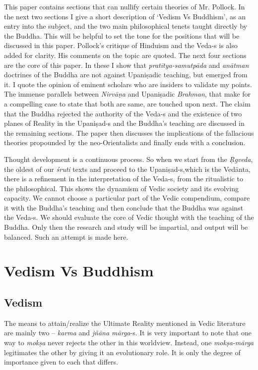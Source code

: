 This paper contains sections that can nullify certain theories of Mr. Pollock. In the next two sections I give a short description of ‘Vedism Vs Buddhism’, as an entry into the subject, and the two main philosophical tenets taught directly by the Buddha. This will be helpful to set the tone for the positions that will be discussed in this paper. Pollock’s critique of Hinduism and the Veda-s is also added for clarity. His comments on the topic are quoted. The next four sections are the core of this paper. In these I show that \textit{pratītya-samutpāda} and \textit{anātman} doctrines of the Buddha are not against Upaniṣadic teaching, but emerged from it. I quote the opinion of eminent scholars who are insiders to validate my points. The immense parallels between \textit{Nirvāṇa} and Upaniṣadic \textit{Brahman}, that make for a compelling case to state that both are same, are touched upon next. The claim that the Buddha rejected the authority of the Veda-s and the existence of two planes of Reality in the Upaniṣad-s and the Buddha’s teaching are discussed in the remaining sections. The paper then discusses the implications of the fallacious theories propounded by the neo-Orientalists and finally ends with a conclusion.

Thought development is a continuous process. So when we start from the \textit{Ṛgveda}, the oldest of our \textit{śruti} texts and proceed to the Upaniṣad-s,\break which is the Vedānta, there is a refinement in the interpretation of the Veda-s, from the ritualistic to the philosophical. This shows the dynamism of Vedic society and its evolving capacity. We cannot choose a particular part of the Vedic compendium, compare it with the Buddha’s teaching and then conclude that the Buddha was against the Veda-s. We should evaluate the core of Vedic thought with the teaching of the Buddha. Only then the research and study will be impartial, and output will be balanced. Such an attempt is made here.


\section*{Vedism Vs Buddhism}

\subsection*{Vedism}

The means to attain/realize the Ultimate Reality mentioned in Vedic literature are mainly two – \textit{karma} and \textit{jñāna mārga}-s. It is very important to note that one way to \textit{mokṣa} never rejects the other in this worldview. Instead, one \textit{mokṣa-mārga} legitimates the other by giving it an evolutionary role. It is only the degree of importance given to each that differs.


